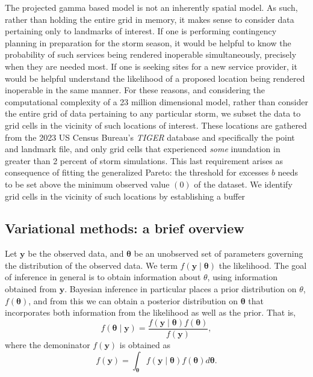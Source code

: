 The projected gamma based model is not an inherently spatial model.  As such, 
    rather than holding the entire grid in memory, it makes sense to consider 
    data pertaining only to landmarks of interest.    If one is performing 
    contingency planning in preparation for the storm season, it would be 
    helpful to know the probability of such services being rendered inoperable 
    simultaneously, precisely when they are needed most.  If one is seeking 
    sites for a new service provider, it would be helpful understand the 
    likelihood of a proposed location being rendered inoperable in the same 
    manner.  For these reasons, and considering the computational complexity of 
    a 23 million dimensional model, rather than consider the entire grid of data 
    pertaining to any particular storm, we subset the data to grid cells in the 
    vicinity of such locations of interest.  These locations are gathered from 
    the 2023 US Census Bureau's \emph{TIGER} database \needcite and specifically 
    the point and landmark file, and only grid cells that experienced \emph{some} 
    inundation in greater than 2  percent of storm 
    simulations.   This last requirement arises as consequence of fitting the 
    generalized Pareto: the threshold for excesses $b$ needs to be set above the 
    minimum observed value $(0)$ of the dataset.  
      We identify grid cells in 
    the vicinity of such locations by establishing a buffer 

\subsection{Variational methods: a brief overview}
Let $\bm{y}$ be the observed data, and $\bm{\theta}$ be an unobserved set of 
    parameters governing the distribution of the observed data.  We term 
    $f(\bm{y}\mid\bm{\theta})$ the likelihood.  The goal of inference in 
    general is to obtain information about $\theta$, using information 
    obtained from $\bm{y}$. Bayesian inference in particular places a prior
    distribution on $\theta$, $f(\bm{\theta})$, and from this we can obtain a
    posterior distribution on $\bm{\theta}$ that incorporates both information
    from the likelihood as well as the prior.  That is,
    \[
        f(\bm{\theta}\mid\bm{y}) = 
            \frac{f(\bm{y}\mid\bm{\theta})f(\bm{\theta})}{f(\bm{y})},
    \]
    where the demoninator $f(\bm{y})$ is obtained as
    \[
    f(\bm{y}) = \int_{\bm{\theta}}f(\bm{y}\mid\bm{\theta})f(\bm{\theta})d\bm{\theta}.
    \]

